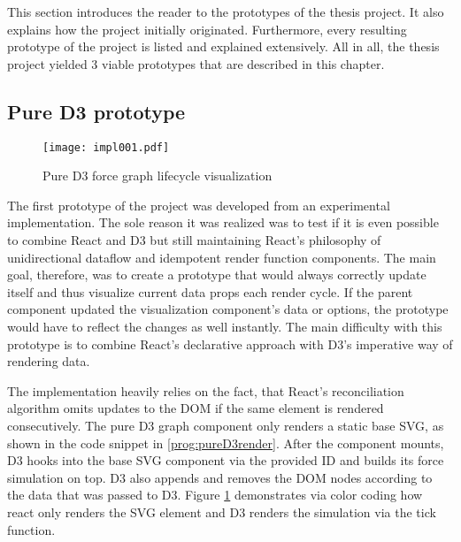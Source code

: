 This section introduces the reader to the prototypes of the thesis project. It also explains how the project initially originated. Furthermore, every resulting prototype of the project is listed and explained extensively. All in all, the thesis project yielded 3 viable prototypes that are described in this chapter. 


\subsection{Pure D3 prototype}

\begin{figure}
\centering
\texttt{[image: impl001.pdf]}
\caption{Pure D3 force graph lifecycle visualization}
\label{fig:pureD3Lifecycle}
\end{figure}

The first prototype of the project was developed from an experimental implementation. The sole reason it was realized was to test if it is even possible to combine React and D3 but still maintaining React's philosophy of unidirectional dataflow and idempotent render function components. The main goal, therefore, was to create a prototype that would always correctly update itself and thus visualize current data props each render cycle. If the parent component updated the visualization component's data or options, the prototype would have to reflect the changes as well instantly. The main difficulty with this prototype is to combine React's declarative approach with D3's imperative way of rendering data.

The implementation heavily relies on the fact, that React's reconciliation algorithm omits updates to the DOM if the same element is rendered consecutively. The pure D3 graph component only renders a static base SVG, as shown in the code snippet in \ref{prog:pureD3render}. After the component mounts, D3 hooks into the base SVG component via the provided ID and builds its force simulation on top. D3 also appends and removes the DOM nodes according to the data that was passed to D3. Figure \ref{fig:pureD3Lifecycle} demonstrates via color coding how react only renders the SVG element and D3 renders the simulation via the tick function.

